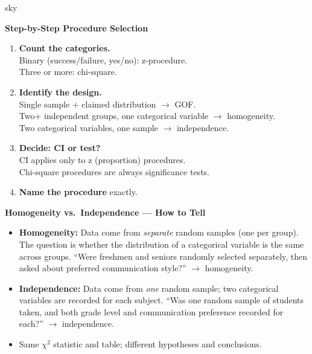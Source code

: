 \documentclass[10pt]{article}
\begin{document}
\begin{skillbox}{sky}
\begin{minipage}[t]{0.48\linewidth}
    \textbf{Step-by-Step Procedure Selection}
    \begin{enumerate}
        \item \textbf{Count the categories.}\\
              Binary (success/failure, yes/no): z-procedure.\\
              Three or more: chi-square.
        \item \textbf{Identify the design.}\\
              Single sample + claimed distribution $\to$ GOF.\\
              Two+ independent groups, one categorical variable $\to$ homogeneity.\\
              Two categorical variables, one sample $\to$ independence.
        \item \textbf{Decide: CI or test?}\\
              CI applies only to z (proportion) procedures.\\
              Chi-square procedures are always significance tests.
        \item \textbf{Name the procedure} exactly.
    \end{enumerate}
\end{minipage}
\hfill
\begin{minipage}[t]{0.48\linewidth}
    \textbf{Homogeneity vs.\ Independence --- How to Tell}
    \begin{itemize}
        \item \textbf{Homogeneity:} Data come from \emph{separate} random samples (one per
              group). The question is whether the distribution of a categorical variable is the
              same across groups.
              ``Were freshmen and seniors randomly selected separately, then asked about
              preferred communication style?'' $\to$ homogeneity.
        \item \textbf{Independence:} Data come from \emph{one} random sample; two categorical
              variables are recorded for each subject.
              ``Was one random sample of students taken, and both grade level and communication
              preference recorded for each?'' $\to$ independence.
        \item Same $\chi^2$ statistic and table; different hypotheses and conclusions.
    \end{itemize}
\end{minipage}
\end{skillbox}
\end{document}
